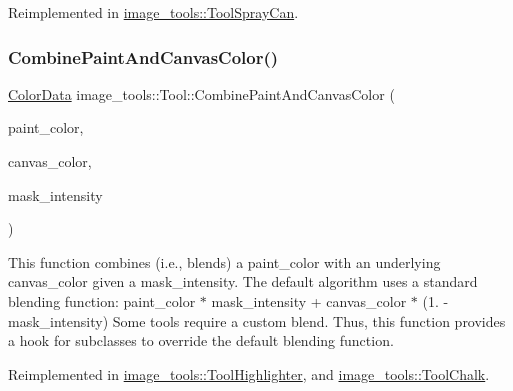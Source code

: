 Reimplemented in \hyperlink{classimage__tools_1_1ToolSprayCan_acd1e7907873ef757f200bf669d8dbfd9}{image\+\_\+tools\+::\+Tool\+Spray\+Can}.

\mbox{\label{classimage__tools_1_1Tool_a1f4f417dd13da9ff60481e3e1ff30b69}} 
\subsubsection{\texorpdfstring{Combine\+Paint\+And\+Canvas\+Color()}{CombinePaintAndCanvasColor()}}
{\footnotesize\ttfamily \hyperlink{classimage__tools_1_1ColorData}{Color\+Data} image\+\_\+tools\+::\+Tool\+::\+Combine\+Paint\+And\+Canvas\+Color (\begin{DoxyParamCaption}\item[{const \hyperlink{classimage__tools_1_1ColorData}{Color\+Data} \&}]{paint\+\_\+color,  }\item[{const \hyperlink{classimage__tools_1_1ColorData}{Color\+Data} \&}]{canvas\+\_\+color,  }\item[{float}]{mask\+\_\+intensity }\end{DoxyParamCaption})\hspace{0.3cm}{\ttfamily [virtual]}}

This function combines (i.\+e., blends) a paint\+\_\+color with an underlying canvas\+\_\+color given a mask\+\_\+intensity. The default algorithm uses a standard blending function\+: paint\+\_\+color $\ast$ mask\+\_\+intensity + canvas\+\_\+color $\ast$ (1. -\/ mask\+\_\+intensity) Some tools require a custom blend. Thus, this function provides a hook for subclasses to override the default blending function. 

Reimplemented in \hyperlink{classimage__tools_1_1ToolHighlighter_a8f4f3c016d4965edd02ad8e8559af4d1}{image\+\_\+tools\+::\+Tool\+Highlighter}, and \hyperlink{classimage__tools_1_1ToolChalk_ab2c6eda363c0fbc2283128eebbd817f5}{image\+\_\+tools\+::\+Tool\+Chalk}.

\mbox{\label{classimage__tools_1_1Tool_a7d58325846dbc0467e52221daa1310a7}} 
